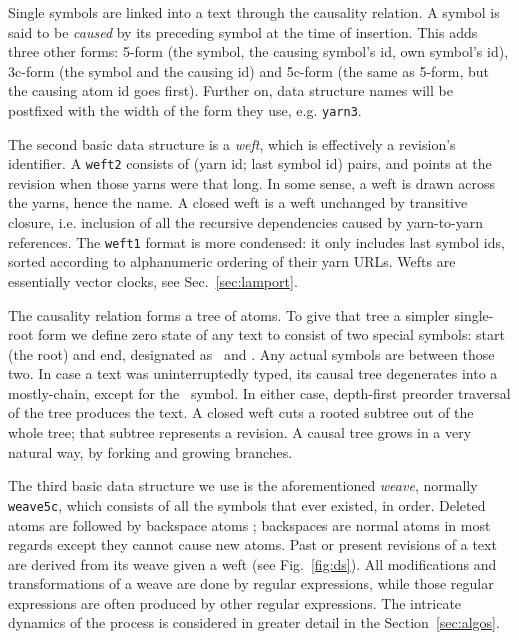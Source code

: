 \documentclass{acm_proc_article-sp}
\begin{document}
Single symbols are linked into a text through the causality
relation. A symbol is said to be \emph{caused} by its preceding
symbol at the time of
insertion. This adds three other forms: 5-form (the symbol, the causing
symbol's id, own symbol's id), 3c-form (the symbol and the causing
id) and 5c-form (the same as 5-form, but the causing atom id
goes first).
Further on, data structure names will be postfixed
with the width of the form they use, e.g. {\tt yarn3}.

The second basic data structure is a \emph{weft}, which
is effectively a revision's identifier. A {\tt weft2} consists
of (yarn id; last symbol id) pairs, and points at the
revision when those yarns were that long. 
In some sense, a weft is drawn across the yarns,
hence the name. A closed weft is
a weft unchanged by transitive closure, i.e. inclusion of
all the recursive dependencies caused by yarn-to-yarn
references. The {\tt weft1} format is more condensed:
it only includes last symbol ids, sorted
according to alphanumeric ordering of their yarn URLs.
Wefts are essentially vector clocks,
see Sec.~\ref{sec:lamport}.

The causality relation forms a tree of atoms.
To give that tree a simpler single-root form we define zero
state of any text to consist of two special symbols: start (the root)
and end, designated as \aum ~and \eoa. Any actual symbols are
between those two.
In case a text was uninterruptedly typed, its causal tree
degenerates into a mostly-chain, except for the \eoa ~symbol.
In either case, depth-first preorder traversal of the tree
produces the text. A closed weft cuts a rooted subtree out
of the whole tree; that subtree represents a revision.
A causal tree grows in a very natural way, by forking and
growing branches.

The third basic data structure we use is the aforementioned
\emph{weave}, normally {\tt weave5c},
which consists of all the symbols that ever existed, in order. 
Deleted atoms are followed by backspace atoms \bsp; backspaces
are normal atoms in most regards except they cannot cause
new atoms.
Past or present revisions of a text are derived from its
weave given a weft (see Fig.~\ref{fig:ds}).
All modifications and transformations of a weave are done by
regular expressions, while those regular expressions are often
produced by other regular expressions. The intricate dynamics of
the process is considered in greater detail in the 
Section~\ref{sec:algos}.
\end{document}
